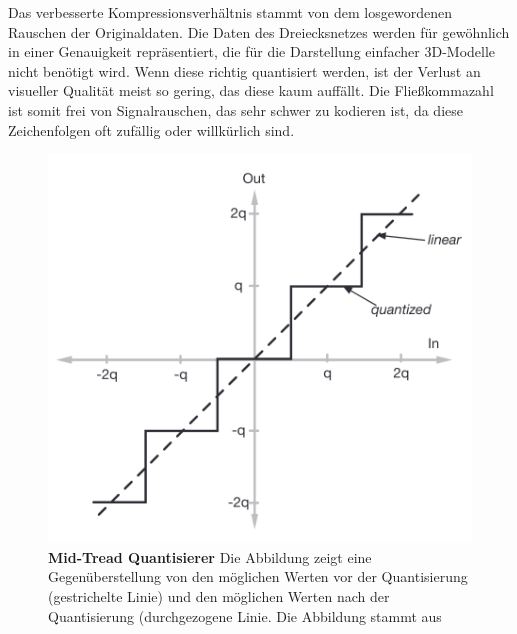 Das verbesserte Kompressionsverhältnis stammt von dem losgewordenen Rauschen der Originaldaten.
Die Daten des Dreiecksnetzes werden für gewöhnlich in einer Genauigkeit repräsentiert, die für die Darstellung einfacher 3D-Modelle nicht benötigt wird.
Wenn diese richtig quantisiert werden, ist der Verlust an visueller Qualität meist so gering, das diese kaum auffällt.
Die Fließkommazahl ist somit frei von Signalrauschen, das sehr schwer zu kodieren ist, da diese Zeichenfolgen oft zufällig oder willkürlich sind.
\begin{figure}[htb]
  \centering  
  \includegraphics[scale=0.35]{Bilder/quantization.png}
  \caption[Mid-Tread Quantisierer]{\textbf{Mid-Tread Quantisierer} Die Abbildung zeigt eine Gegenüberstellung von den möglichen Werten vor der Quantisierung (gestrichelte Linie) und den möglichen Werten nach der Quantisierung (durchgezogene Linie.
  Die Abbildung stammt aus \cite{Bennett2020} }
  \label{fig:mid-tread_quantizer}
\end{figure}

